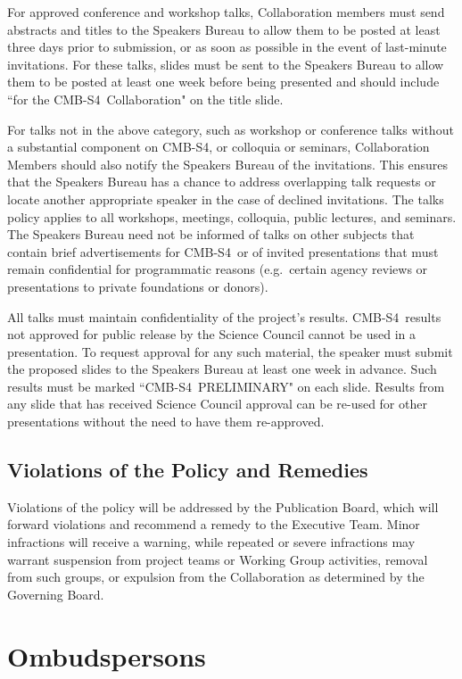 \documentclass[12pt]{article}
\newcommand\collabname{CMB-S4}
\begin{document}
For approved conference and workshop talks, Collaboration members must send abstracts and titles to the Speakers Bureau to allow them to be posted at least three days prior to submission, or as soon as possible in the event of last-minute invitations. For these talks, slides must be sent to the Speakers Bureau to allow them to be posted at least one week before being presented and should include ``for the \collabname\ Collaboration" on the title slide.

For talks not in the above category, such as workshop or conference talks without a substantial component on \collabname, or colloquia or seminars, Collaboration Members should also notify the Speakers Bureau of the invitations. This ensures that the Speakers Bureau has a chance to address overlapping talk requests or locate another appropriate speaker in the case of declined invitations.  The talks policy applies to all workshops, meetings, colloquia, public lectures, and seminars.  The Speakers Bureau need not be informed of talks on other subjects that contain brief advertisements for \collabname\  or of invited presentations that must remain confidential for programmatic reasons (e.g.~certain agency reviews or presentations to private foundations or donors).

All talks must maintain confidentiality of the project's results. \collabname\ results not approved for public release by the Science Council cannot be used in a presentation. To request approval for any such material, the speaker must submit the proposed slides to the Speakers Bureau at least one week in advance. Such results must be marked ``\collabname\ PRELIMINARY" on each slide. Results from any slide that has received Science Council approval can be re-used for other presentations without the need to have them re-approved. 

\subsection{Violations of the Policy and Remedies}

Violations of the policy will be addressed by the Publication Board, which will forward violations and recommend a remedy to the Executive Team.  Minor infractions will receive a warning, while repeated or severe infractions may warrant suspension from project teams or Working Group activities, removal from such groups, or expulsion from the Collaboration as determined by the Governing Board.

\section{Ombudspersons}
\end{document}
